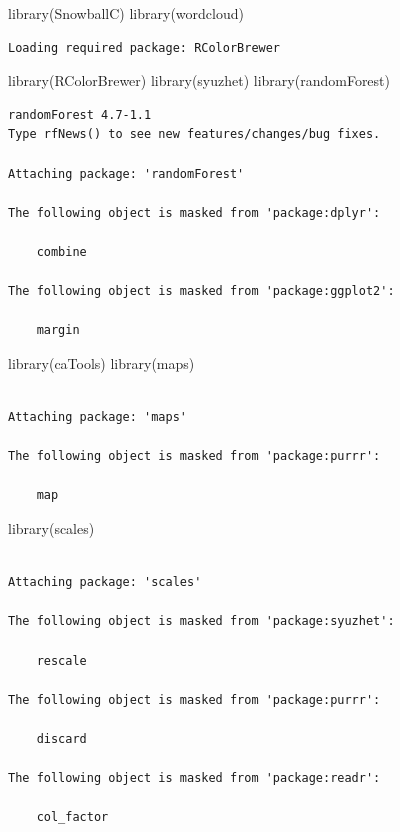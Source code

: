 \documentclass[
  letterpaper,
  DIV=11,
  numbers=noendperiod]{scrartcl}
\newenvironment{Shaded}{\begin{snugshade}}{\end{snugshade}}
\newcommand{\FunctionTok}[1]{\textcolor[rgb]{0.28,0.35,0.67}{#1}}
\newcommand{\NormalTok}[1]{\textcolor[rgb]{0.00,0.23,0.31}{#1}}
\begin{document}
\begin{Shaded}
\begin{Highlighting}[]
\FunctionTok{library}\NormalTok{(SnowballC)}
\FunctionTok{library}\NormalTok{(wordcloud)}
\end{Highlighting}
\end{Shaded}

\begin{verbatim}
Loading required package: RColorBrewer
\end{verbatim}

\begin{Shaded}
\begin{Highlighting}[]
\FunctionTok{library}\NormalTok{(RColorBrewer)}
\FunctionTok{library}\NormalTok{(syuzhet)}
\FunctionTok{library}\NormalTok{(randomForest)}
\end{Highlighting}
\end{Shaded}

\begin{verbatim}
randomForest 4.7-1.1
Type rfNews() to see new features/changes/bug fixes.

Attaching package: 'randomForest'

The following object is masked from 'package:dplyr':

    combine

The following object is masked from 'package:ggplot2':

    margin
\end{verbatim}

\begin{Shaded}
\begin{Highlighting}[]
\FunctionTok{library}\NormalTok{(caTools)}
\FunctionTok{library}\NormalTok{(maps)}
\end{Highlighting}
\end{Shaded}

\begin{verbatim}

Attaching package: 'maps'

The following object is masked from 'package:purrr':

    map
\end{verbatim}

\begin{Shaded}
\begin{Highlighting}[]
\FunctionTok{library}\NormalTok{(scales)}
\end{Highlighting}
\end{Shaded}

\begin{verbatim}

Attaching package: 'scales'

The following object is masked from 'package:syuzhet':

    rescale

The following object is masked from 'package:purrr':

    discard

The following object is masked from 'package:readr':

    col_factor
\end{verbatim}
\end{document}
